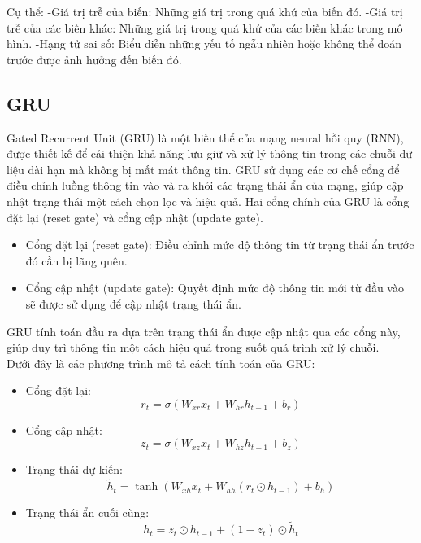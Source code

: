 \documentclass[conference]{IEEEtran}
\begin{document}
	Cụ thể:
	-Giá trị trễ của biến: Những giá trị trong quá khứ của biến đó.
	-Giá trị trễ của các biến khác: Những giá trị trong quá khứ của các biến khác trong mô hình.
	-Hạng tử sai số: Biểu diễn những yếu tố ngẫu nhiên hoặc không thể đoán trước được ảnh hưởng đến biến đó.
	
	\subsection{GRU}
	Gated Recurrent Unit (GRU) là một biến thể của mạng neural hồi quy (RNN), được thiết kế để cải thiện khả năng lưu giữ và xử lý thông tin trong các chuỗi dữ liệu dài hạn mà không bị mất mát thông tin. GRU sử dụng các cơ chế cổng để điều chỉnh luồng thông tin vào và ra khỏi các trạng thái ẩn của mạng, giúp cập nhật trạng thái một cách chọn lọc và hiệu quả. Hai cổng chính của GRU là cổng đặt lại (reset gate) và cổng cập nhật (update gate).
	\begin{itemize}
		\item Cổng đặt lại (reset gate): Điều chỉnh mức độ thông tin từ trạng thái ẩn trước đó cần bị lãng quên.\\
		\item Cổng cập nhật (update gate): Quyết định mức độ thông tin mới từ đầu vào sẽ được sử dụng để cập nhật trạng thái ẩn.
	\end{itemize}
	GRU tính toán đầu ra dựa trên trạng thái ẩn được cập nhật qua các cổng này, giúp duy trì thông tin một cách hiệu quả trong suốt quá trình xử lý chuỗi.\\
	Dưới đây là các phương trình mô tả cách tính toán của GRU:
	\begin{itemize}
		\item Cổng đặt lại: 
		\begin{equation}
			r_t = \sigma(W_{xr} x_t + W_{hr} h_{t-1} + b_r)
		\end{equation}
		\item Cổng cập nhật: 
		\begin{equation}
			z_t = \sigma(W_{xz} x_t + W_{hz} h_{t-1} + b_z)
		\end{equation}
		\item Trạng thái dự kiến: 
		\begin{equation}
			\tilde{h}_t = \tanh(W_{xh} x_t + W_{hh} (r_t \odot h_{t-1}) + b_h)
		\end{equation}
		\item Trạng thái ẩn cuối cùng:
		\begin{equation}
			h_t = z_t \odot h_{t-1} + (1 - z_t) \odot \tilde{h}_t
		\end{equation}
	\end{itemize}
\end{document}

